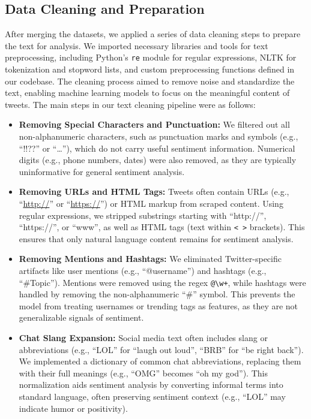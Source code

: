 \subsection{Data Cleaning and Preparation}

After merging the datasets, we applied a series of data cleaning steps to prepare the text for analysis. We imported necessary libraries and tools for text preprocessing, including Python's \texttt{re} module for regular expressions, NLTK for tokenization and stopword lists, and custom preprocessing functions defined in our codebase. The cleaning process aimed to remove noise and standardize the text, enabling machine learning models to focus on the meaningful content of tweets. The main steps in our text cleaning pipeline were as follows:

\begin{itemize}
    \item \textbf{Removing Special Characters and Punctuation:} We filtered out all non-alphanumeric characters, such as punctuation marks and symbols (e.g., ``!!??'' or ``\ldots''), which do not carry useful sentiment information. Numerical digits (e.g., phone numbers, dates) were also removed, as they are typically uninformative for general sentiment analysis.
    
    \item \textbf{Removing URLs and HTML Tags:} Tweets often contain URLs (e.g., ``\url{http://}'' or ``\url{https://}'') or HTML markup from scraped content. Using regular expressions, we stripped substrings starting with ``http://'', ``https://'', or ``www'', as well as HTML tags (text within \texttt{< >} brackets). This ensures that only natural language content remains for sentiment analysis.

    \item \textbf{Removing Mentions and Hashtags:} We eliminated Twitter-specific artifacts like user mentions (e.g., ``@username'') and hashtags (e.g., ``\#Topic''). Mentions were removed using the regex \texttt{@\textbackslash w+}, while hashtags were handled by removing the non-alphanumeric ``\#'' symbol. This prevents the model from treating usernames or trending tags as features, as they are not generalizable signals of sentiment.

    \item \textbf{Chat Slang Expansion:} Social media text often includes slang or abbreviations (e.g., ``LOL'' for ``laugh out loud'', ``BRB'' for ``be right back''). We implemented a dictionary of common chat abbreviations, replacing them with their full meanings (e.g., ``OMG'' becomes ``oh my god''). This normalization aids sentiment analysis by converting informal terms into standard language, often preserving sentiment context (e.g., ``LOL'' may indicate humor or positivity).


\end{itemize}

